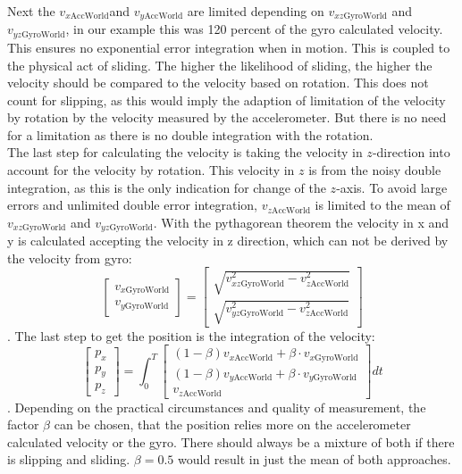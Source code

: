 \documentclass[letterpaper, 10 pt, conference]{ieeeconf}  %
\begin{document}
 
 Next the $v_{x\text{AccWorld}} $and $v_{y\text{AccWorld}} $ are limited depending on $v_{xz\text{GyroWorld}} $ and $ v_{yz\text{GyroWorld}}$, in our example this was 120 percent of the gyro calculated velocity.
 This ensures no exponential error integration when in motion.
 This is coupled to the physical act of sliding.
 The higher the likelihood of sliding, the higher the velocity should be compared to the velocity based on rotation.
 This does not count for slipping, as this would imply the adaption of limitation of the velocity by rotation by the velocity measured by the accelerometer.
 But there is no need for a limitation as there is no double integration with the rotation.\\
 The last step for calculating the velocity is taking the velocity in $z$-direction into account for the velocity by rotation.
 This velocity in $z$ is from the noisy double integration, as this is the only indication for change of the $z$-axis.
 To avoid large errors and unlimited double error integration, $v_{z\text{AccWorld}} $ is limited to the mean of $v_{xz\text{GyroWorld}} $ and $ v_{yz\text{GyroWorld}}$.
With the pythagorean theorem the velocity in x and y is calculated accepting the velocity in z direction, which can not be derived by the velocity from gyro:
 \begin{equation}
\begin{bmatrix}
v_{x\text{GyroWorld}} \\ v_{y\text{GyroWorld}}
\end{bmatrix} = 
\begin{bmatrix}
\sqrt{v_{xz\text{GyroWorld}}^2-v_{z\text{AccWorld}}^2}  \\ \sqrt{v_{yz\text{GyroWorld}}^2-v_{z\text{AccWorld}}^2 } 
\end{bmatrix}
\end{equation}.
The last step to get the position is the integration of the velocity:
\begin{equation}
\begin{bmatrix}
p_x \\ p_y \\p_z
\end{bmatrix}
 = \int_0^T \begin{bmatrix}
 (1-\beta)v_{x\text{AccWorld}} + \beta \cdot v_{x\text{GyroWorld}} 
 \\
  (1-\beta)v_{y\text{AccWorld}} + \beta \cdot v_{y\text{GyroWorld}} 
 \\
 v_{z\text{AccWorld}} 
 \end{bmatrix} dt
\end{equation}.
Depending on the practical circumstances and quality of measurement, the factor $\beta$ can be chosen, that the position relies more on the accelerometer calculated velocity or the gyro.
There should always be a mixture of both if there is slipping and sliding.
$\beta =0.5$ would result in just the mean of both approaches.
\end{document}
